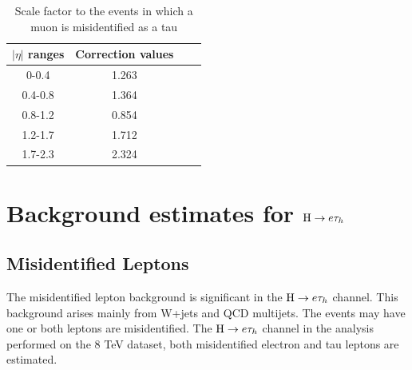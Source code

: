 \begin{table}[htp]
\caption{Scale factor to the events in which a muon is misidentified as a tau}\label{tb:MFTcorrection}
\begin{center}
\begin{tabular}{|c|c|c|c|}
\hline
$|\eta|$ ranges             & Correction values \\\hline
0-0.4                             & 1.263                   \\
0.4-0.8                          & 1.364           \\
0.8-1.2                          & 0.854        \\
1.2-1.7                          & 1.712  \\
1.7-2.3                          & 2.324                                  \\\hline
 \end{tabular}
\end{center}
\end{table}







\section{Background estimates for $\mathrm{H} \to e \tau_{h}$}

\subsection{Misidentified Leptons}

The misidentified lepton background is significant in  the $\mathrm{H} \to e \tau_{h}$ channel. This background arises mainly from W+jets and QCD multijets. The events may have one or both leptons are misidentified. The $\mathrm{H} \to e \tau_{h}$ channel in the analysis performed on the 8 TeV dataset, both misidentified electron and tau leptons are estimated. 

